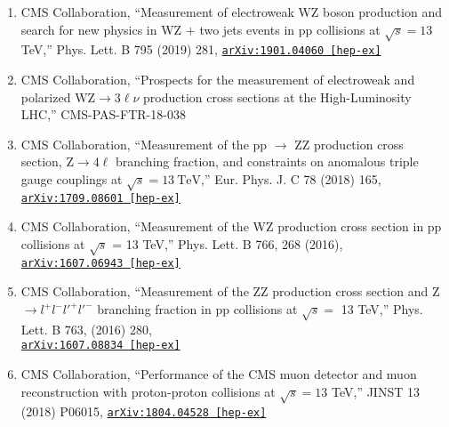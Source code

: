 \documentclass[10pt]{res} %
\begin{document}
\begin{resume}
\begin{enumerate}[itemindent=1mm,labelsep=1mm]
  \item CMS Collaboration, ``Measurement of electroweak WZ boson production and search for new physics in WZ $+$ two jets events in pp collisions at $\sqrt{s}=13$\,TeV,'' Phys. Lett. B 795 (2019) 281, \href{https://arxiv.org/abs/1901.04060} {\texttt{arXiv:1901.04060 [hep-ex]}}
  \item CMS Collaboration, ``Prospects for the measurement of electroweak and polarized $\mathrm{WZ}\to3\ell\nu$ production cross sections at the High-Luminosity LHC,'' CMS-PAS-FTR-18-038
  \item CMS Collaboration, ``Measurement of the pp $\rightarrow$ ZZ production cross section, $\mathrm{Z} \to 4\ell$ branching fraction, and constraints on anomalous triple gauge couplings at $\sqrt{s} = 13~\mathrm{TeV}$,'' Eur. Phys. J. C 78 (2018) 165, \href{https://arxiv.org/abs/1709.08601}{\texttt{arXiv:1709.08601 [hep-ex]}}
  \item CMS Collaboration, ``Measurement of the WZ production cross section in pp collisions at $\sqrt{s}$ = 13 TeV,''
Phys. Lett. B 766, 268 (2016), \href{https://arxiv.org/abs/1607.06943}{\texttt{arXiv:1607.06943 [hep-ex]}}
  \item CMS Collaboration, ``Measurement of the ZZ production cross section and Z $\rightarrow l^{+}l^{-}l'^{+}l'^{-}$ branching fraction in pp collisions at $\sqrt{s} =$ 13 TeV,''
Phys. Lett. B 763, (2016) 280, \\ \href{https://arxiv.org/abs/1607.08834} {\texttt{arXiv:1607.08834 [hep-ex]}}
  \item CMS Collaboration, ``Performance of the CMS muon detector and muon reconstruction with proton-proton collisions at $\sqrt{s} = 13$ TeV,''
JINST 13 (2018) P06015, \href{https://arxiv.org/abs/1804.04528} {\texttt{arXiv:1804.04528 [hep-ex]}}
\end{enumerate}


\end{resume}
\end{document}
